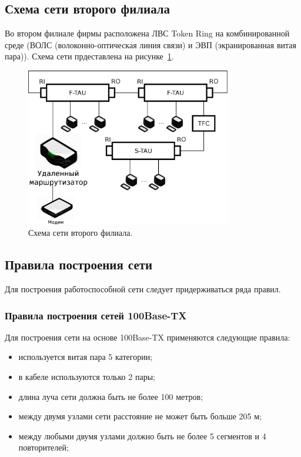 \documentclass[russian,utf8,emptystyle]{eskdtext}
\begin{document}
\clearpage
\subsection{Схема сети второго филиала}
Во втором филиале фирмы расположена ЛВС Token Ring на комбинированной среде (ВОЛС (волоконно-оптическая линия связи) и ЭВП (экранированная витая пара)). Схема сети прдеставлена на рисунке~\ref{fig:filial-ofice-2}.

\begin{figure}[h!]
\centering
\includegraphics[width=0.8\textwidth]{filial_ofice_2}
\caption{Схема сети второго филиала.}
\label{fig:filial-ofice-2}
\end{figure}

\clearpage
\subsection{Правила построения сети}
Для построения работоспособной сети следует придерживаться ряда правил.

\subsubsection{Правила построения сетей 100Base-TX}
Для построения сети на основе 100Base-TX применяются следующие правила:
\begin{itemize}[label=-]
\item используется витая пара 5 категории;
\item в кабеле используются только 2 пары;
\item длина луча сети должна быть не более 100 метров;
\item между двумя узлами сети расстояние не может быть больше 205 м;
\item между любыми двумя узлами должно быть не более 5 сегментов и 4 повторителей;
\end{itemize}
\end{document}
